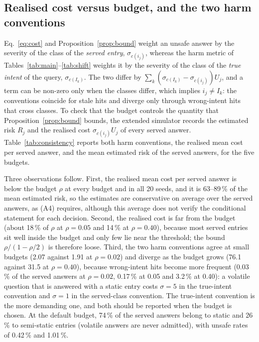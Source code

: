 \documentclass[journal]{IEEEtran}
\newcommand{\pct}{\,\%}
\begin{document}
\subsection{Realised cost versus budget, and the two harm conventions}\label{sec:consistency}
Eq.~\eqref{eq:cost} and Proposition~\ref{prop:bound} weight an unsafe answer by the severity of the class of the \emph{served entry}, $\sigma_{c(i_j)}$, whereas the harm metric of Tables~\ref{tab:main}--\ref{tab:shift} weights it by the severity of the class of the \emph{true intent} of the query, $\sigma_{c(I_k)}$. The two differ by $\sum_k(\sigma_{c(I_k)}-\sigma_{c(i_j)})U_j$, and a term can be non-zero only when the classes differ, which implies $i_j\neq I_k$: the conventions coincide for stale hits and diverge only through wrong-intent hits that cross classes. To check that the budget controls the quantity that Proposition~\ref{prop:bound} bounds, the extended simulator records the estimated risk $R_j$ and the realised cost $\sigma_{c(i_j)}U_j$ of every served answer. Table~\ref{tab:consistency} reports both harm conventions, the realised mean cost per served answer, and the mean estimated risk of the served answers, for the five budgets.

Three observations follow. First, the realised mean cost per served answer is below the budget $\rho$ at every budget and in all 20 seeds, and it is 63--89\pct{} of the mean estimated risk, so the estimates are conservative on average over the served answers, as (A4) requires, although this average does not verify the conditional statement for each decision. Second, the realised cost is far from the budget (about 18\pct{} of $\rho$ at $\rho=0.05$ and 14\pct{} at $\rho=0.40$), because most served entries sit well inside the budget and only few lie near the threshold; the bound $\rho/(1-\rho/2)$ is therefore loose. Third, the two harm conventions agree at small budgets (2.07 against 1.91 at $\rho=0.02$) and diverge as the budget grows (76.1 against 31.5 at $\rho=0.40$), because wrong-intent hits become more frequent (0.03\pct{} of the served answers at $\rho=0.02$, 0.17\pct{} at 0.05 and 3.2\pct{} at 0.40): a volatile question that is answered with a static entry costs $\sigma=5$ in the true-intent convention and $\sigma=1$ in the served-class convention. The true-intent convention is the more demanding one, and both should be reported when the budget is chosen. At the default budget, 74\pct{} of the served answers belong to static and 26\pct{} to semi-static entries (volatile answers are never admitted), with unsafe rates of 0.42\pct{} and 1.01\pct{}.
\end{document}
